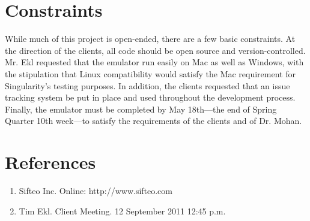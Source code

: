 \documentclass[12pt]{article}
\begin{document}
\section{Constraints}
        While much of this project is open-ended, there are a few basic constraints. At the direction of the clients, all code should be open source and version-controlled. Mr. Ekl requested that the emulator run easily on Mac as well as Windows, with the stipulation that Linux compatibility would satisfy the Mac requirement for Singularity's testing purposes. In addition, the clients requested that an issue tracking system be put in place and used throughout the development process. Finally, the emulator must be completed by May 18th---the end of Spring Quarter 10th week---to satisfy the requirements of the clients and of Dr. Mohan.

\clearpage
{}
\printglossaries
\clearpage

\section*{References}

        \begin{enumerate}
                \item{Sifteo Inc. Online: http://www.sifteo.com}
                \item{Tim Ekl.  Client Meeting.  12 September 2011 12:45 p.m.}
        \end{enumerate}

\printindex
\end{document}

